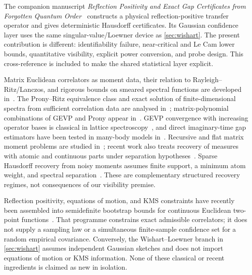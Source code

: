 \documentclass[11pt]{article}
\theoremstyle{definition}
\theoremstyle{remark}
\begin{document}
The companion manuscript \emph{Reflection Positivity and Exact Gap
Certificates from Forgotten Quantum Order}~\cite{ErikssonRP2026} constructs a
physical reflection-positive transfer operator and gives deterministic
Hausdorff certificates.  Its Gaussian confidence layer uses the same
singular-value/Loewner device as \cref{sec:wishart}.  The present contribution
is different: identifiability failure, near-critical and Le Cam lower bounds,
quantitative visibility, explicit power conversion, and probe design.  This
cross-reference is included to make the shared statistical layer explicit.

Matrix Euclidean correlators as moment data, their relation to
Rayleigh--Ritz/Lanczos, and rigorous bounds on smeared spectral functions are
developed in~\cite{MomentMatrix2025}.  The Prony--Ritz equivalence class and
exact solution of finite-dimensional spectra from sufficient correlation data
are analysed in~\cite{FilteredRR}; matrix-polynomial combinations of GEVP and
Prony appear in~\cite{Fleming2023}.  GEVP convergence with increasing operator
bases is classical in lattice spectroscopy~\cite{Blossier2009}, and direct
imaginary-time gap estimators have been tested in many-body models
in~\cite{SuwaTodo2015,Leamer2023}.  Recursive and flat matrix moment problems
are studied in~\cite{CurtoMatrix2022,CurtoExtremal2006,Madler2023}; recent work
also treats recovery of measures with atomic and continuous parts under
separation hypotheses~\cite{Karapetyan2026}.  Sparse Hausdorff recovery from
noisy moments assumes finite support, a minimum atom weight, and spectral
separation~\cite{Gordon2020}.  These are complementary structured recovery
regimes, not consequences of our visibility premise.

Reflection positivity, equations of motion, and KMS constraints have recently
been assembled into semidefinite bootstrap bounds for continuous Euclidean
two-point functions~\cite{Cho2025}.  That programme constrains exact admissible
correlators; it does not supply a sampling law or a simultaneous finite-sample
confidence set for a random empirical covariance.  Conversely, the
Wishart--Loewner branch in \cref{sec:wishart} assumes independent Gaussian
sketches and does not
import equations of motion or KMS information.  None of these classical or
recent ingredients is claimed as new in isolation.
\end{document}
